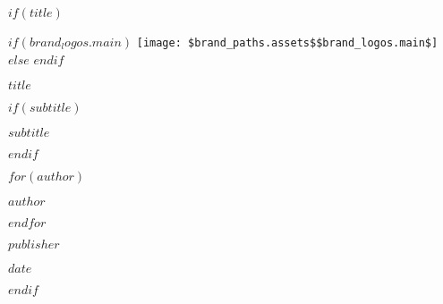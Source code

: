 
$if(title)$
\begin{titlepage}
\begin{center}

$if(brand_logos.main)$
\vspace*{1cm}
\texttt{[image: \$brand\_paths.assets\$\$brand\_logos.main\$]}
\vspace*{2cm}
$else$
\vspace*{3cm}
$endif$

{\Huge\bfseries $title$\par}
\vspace{1.5cm}

$if(subtitle)$
{\Large\itshape $subtitle$\par}
\vspace{1cm}
$endif$

$for(author)$
{\large\bfseries $author$\par}
$endfor$
\vfill

{\large $publisher$\par}
{\large $date$\par}

\end{center}
\end{titlepage}
$endif$